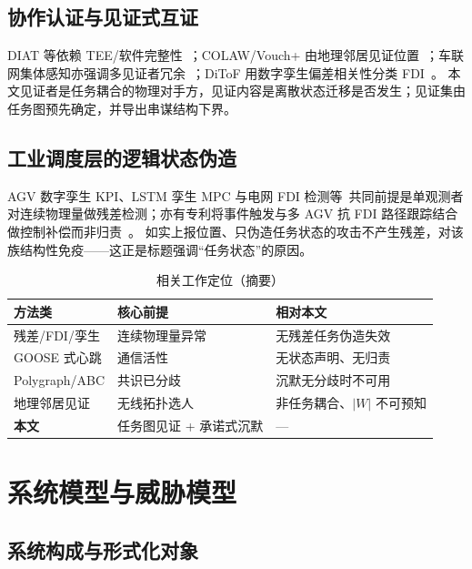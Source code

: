 \documentclass[manuscript,screen,review]{acmart}
\begin{document}
\subsection{协作认证与见证式互证}

DIAT 等依赖 TEE/软件完整性~\cite{diat2019}；COLAW/Vouch+ 由地理邻居见证位置~\cite{colaw2020,vouch2019}；车联网集体感知亦强调多见证者冗余~\cite{etsi460}；DiToF 用数字孪生偏差相关性分类 FDI~\cite{ditof2024}。
本文见证者是任务耦合的物理对手方，见证内容是离散状态迁移是否发生；见证集由任务图预先确定，并导出串谋结构下界。

\subsection{工业调度层的逻辑状态伪造}

AGV 数字孪生 KPI、LSTM 孪生 MPC 与电网 FDI 检测等~\cite{dtmpc2025,agvkpi2022,fdi2024frontiers}共同前提是单观测者对连续物理量做残差检测；亦有专利将事件触发与多 AGV 抗 FDI 路径跟踪结合做控制补偿而非归责~\cite{cn120578205b}。
如实上报位置、只伪造任务状态的攻击不产生残差，对该族结构性免疫——这正是标题强调``任务状态''的原因。

\begin{table}[t]
  \centering
  \caption{相关工作定位（摘要）}
  \label{tab:rw}
  \begin{tabular}{@{}llp{}@{}}
    \toprule
    方法类 & 核心前提 & 相对本文 \\
    \midrule
    残差/FDI/孪生 & 连续物理量异常 & 无残差任务伪造失效 \\
    GOOSE 式心跳 & 通信活性 & 无状态声明、无归责 \\
    Polygraph/ABC & 共识已分歧 & 沉默无分歧时不可用 \\
    地理邻居见证 & 无线拓扑选人 & 非任务耦合、$|W|$ 不可预知 \\
    \textbf{本文} & 任务图见证 + 承诺式沉默 & --- \\
    \bottomrule
  \end{tabular}
\end{table}

\section{系统模型与威胁模型}
\label{sec:model}

\subsection{系统构成与形式化对象}
\label{sec:sys}
\end{document}
